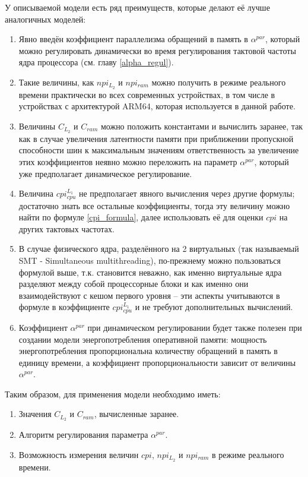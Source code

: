     У описываемой модели есть ряд преимуществ, которые делают её лучше аналогичных моделей:
    \begin{enumerate}
        \item Явно введён коэффициент параллелизма обращений в память в $\alpha^{par}$, который можно
        регулировать динамически во время регулирования тактовой частоты ядра процессора
        (см. главу \ref{alpha_regul}).
        \item Такие величины, как $npi_{L_2}$ и $npi_{ram}$ можно получить в режиме реального времени
        практически во всех современных устройствах, в том числе в устройствах с архитектурой ARM64,
        которая используется в данной работе.
        \item Величины $C_{L_2}$ и $C_{ram}$ можно положить константами и вычислить заранее, так как
        в случае увеличения латентности памяти при приближении пропускной способности шин к максимальным
        значениям ответственность за увеличение этих коэффициентов неявно можно переложить на параметр
        $\alpha^{par}$, который уже предполагает динамическое регулирование.
        \item Величина $cpi_{cpu}^{L_1}$ не предполагает явного вычисления через другие формулы;
        достаточно знать все остальные коэффициенты, тогда эту величину можно найти по формуле
        \eqref{cpi_formula}, далее использовать её для оценки $cpi$ на других тактовых частотах.
        \item В случае физического ядра, разделённого на 2 виртуальных (так называемый
        SMT - Simultaneous multithreading), по-прежнему можно пользоваться формулой выше, т.к.
        становится неважно, как именно виртуальные ядра разделяют между собой процессорные блоки
        и как именно они взаимодействуют с кешом первого уровня -- эти аспекты учитываются
        в формуле в коэффициенте $cpi_{cpu}^{L_1}$ и не требуют дополнительных вычислений.
        \item Коэффициент $\alpha^{par}$ при динамическом регулировании будет также полезен при
        создании модели энергопотребления оперативной памяти: мощность энергопотребления пропорциональна
        количеству обращений в память в единицу времени, а коэффициент пропорциональности зависит от величины
        $\alpha^{par}$.
    \end{enumerate}

    Таким образом, для применения модели необходимо иметь:
    \begin{enumerate}
        \item Значения $C_{L_2}$ и $C_{ram}$, вычисленные заранее.
        \item Алгоритм регулирования параметра $\alpha^{par}$.
        \item Возможность измерения величин $cpi$, $npi_{L_2}$ и $npi_{ram}$ в режиме реального времени.
    \end{enumerate}

